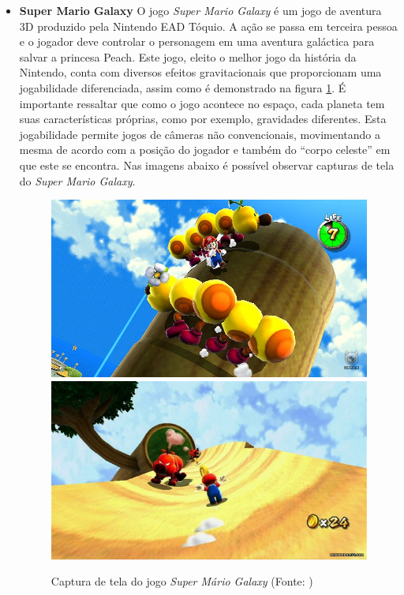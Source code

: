 \begin{itemize}
\item {\bf Super Mario Galaxy\cite{bib:mario_game}}
O jogo \textit{Super Mario Galaxy} é um jogo de aventura 3D produzido 
pela Nintendo EAD Tóquio. A ação se passa 
em terceira pessoa e o jogador deve controlar o personagem em uma aventura 
galáctica para salvar a princesa Peach.
Este jogo, eleito o melhor jogo da história da Nintendo, conta com diversos 
efeitos gravitacionais que proporcionam uma jogabilidade diferenciada, assim como 
é demonstrado na figura \ref{img:mario}. É importante ressaltar que como o jogo acontece no 
espaço, cada planeta tem suas características próprias, como por exemplo, 
gravidades diferentes. 
Esta jogabilidade permite jogos de câmeras não convencionais, movimentando a
 mesma de acordo com a posição do jogador e também do ``corpo celeste'' em que
 este se encontra.
Nas imagens abaixo é possível observar capturas de tela do \textit{Super Mario Galaxy}.

\begin{figure}[!ht]
 \centering
 \includegraphics[scale=0.4]{Imagens/mario1.png}
 \includegraphics[scale=0.4]{Imagens/mario2.png}
 \caption{Captura de tela do jogo \textit{Super Mário Galaxy}
(Fonte: \cite{bib:mario01,bib:mario02})}
 \label{img:mario}
\end{figure}


\end{itemize}
